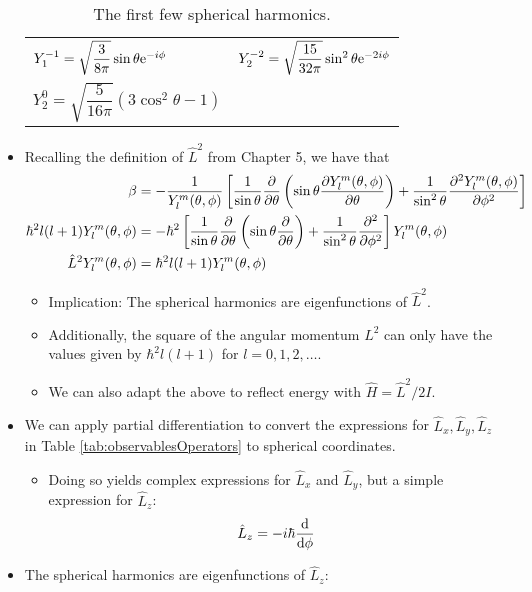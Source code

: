 \documentclass[../notes.tex]{subfiles}
\begin{document}
\begin{itemize}
\begin{table}[h!]
\begin{tabular}{ll}
            $Y_1^{-1}=\sqrt{\dfrac{3}{8\pi}}\sin\theta\e[-i\phi]$ & $Y_2^{-2}=\sqrt{\dfrac{15}{32\pi}}\sin^2\theta\e[-2i\phi]$\\
            $Y_2^0=\sqrt{\dfrac{5}{16\pi}}(3\cos^2\theta-1)$ & \\
            \bottomrule
        \end{tabular}
        \caption{The first few spherical harmonics.}
        \label{tab:sphericalHarmonics}
    \end{table}
    \item {}Recalling the definition of $\hat{L}^2$ from Chapter 5, we have that
    \begin{align*}
        \beta &= -\frac{1}{Y_l^m(\theta,\phi)}\left[ \frac{1}{\sin\theta}\pdv{\theta}\left( \sin\theta\pdv{Y_l^m(\theta,\phi)}{\theta} \right)+\frac{1}{\sin^2\theta}\pdv[2]{Y_l^m(\theta,\phi)}{\phi} \right]\\
        \hbar^2l(l+1)Y_l^m(\theta,\phi) &= -\hbar^2\left[ \frac{1}{\sin\theta}\pdv{\theta}\left( \sin\theta\pdv{\theta} \right)+\frac{1}{\sin^2\theta}\pdv[2]{\phi} \right]Y_l^m(\theta,\phi)\\
        \hat{L}^2Y_l^m(\theta,\phi) &= \hbar^2l(l+1)Y_l^m(\theta,\phi)
    \end{align*}
    \begin{itemize}
        \item Implication: The spherical harmonics are eigenfunctions of $\hat{L}^2$.
        \item Additionally, the square of the angular momentum $L^2$ can only have the values given by $\hbar^2l(l+1)$ for $l=0,1,2,\dots$.
        \item We can also adapt the above to reflect energy with $\hat{H}=\hat{L}^2/2I$.
    \end{itemize}
    \item {}We can apply partial differentiation to convert the expressions for $\hat{L}_x,\hat{L}_y,\hat{L}_z$ in Table \ref{tab:observablesOperators} to spherical coordinates.
    \begin{itemize}
        \item Doing so yields complex expressions for $\hat{L}_x$ and $\hat{L}_y$, but a simple expression for $\hat{L}_z$:
        \begin{equation*}
            \hat{L}_z = -i\hbar\dv{\phi}
        \end{equation*}
    \end{itemize}
    \item The spherical harmonics are eigenfunctions of $\hat{L}_z$:

\end{itemize}
\end{document}
